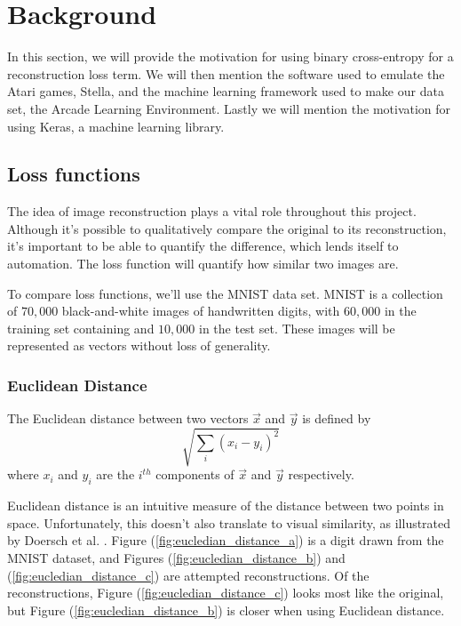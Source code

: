 \chapter{Background}

\label{ch:background}

In this section, we will provide the motivation for using binary cross-entropy for a reconstruction loss term. We will then mention the software used to emulate the Atari games, Stella, and the machine learning framework used to make our data set, the Arcade Learning Environment. Lastly we will mention the motivation for using Keras, a machine learning library.

%
%
%
%
%
\section{Loss functions}

The idea of image reconstruction plays a vital role throughout this project. Although it's possible to qualitatively compare the original to its reconstruction, it's important to be able to quantify the difference, which lends itself to automation. The loss function will quantify how similar two images are.

To compare loss functions, we'll use the MNIST data set. MNIST is a collection of $70,000$ black-and-white images of handwritten digits, with $60,000$ in the training set containing and $10,000$ in the test set. These images will be represented as vectors without loss of generality.

\subsection{Euclidean Distance}

The Euclidean distance between two vectors $\vec{x}$ and $\vec{y}$ is defined by $$\sqrt{\sum_{i}(x_i - y_i)^2}$$ where $x_i$ and $y_i$ are the $i^{th}$ components of $\vec{x}$ and $\vec{y}$ respectively.

Euclidean distance is an intuitive measure of the distance between two points in space. Unfortunately, this doesn't also translate to visual similarity, as illustrated by Doersch et al. \cite{Doersch2016}. Figure (\ref{fig:eucledian_distance_a}) is a digit drawn from the MNIST dataset, and Figures (\ref{fig:eucledian_distance_b}) and (\ref{fig:eucledian_distance_c}) are attempted reconstructions. Of the reconstructions, Figure (\ref{fig:eucledian_distance_c}) looks most like the original, but Figure (\ref{fig:eucledian_distance_b}) is closer when using Euclidean distance.\\

